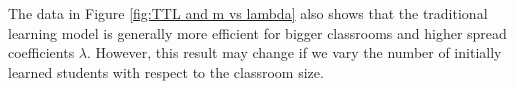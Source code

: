 \documentclass[10pt,a4paper,twoside]{article}
\begin{document}
\noindent The data in Figure \ref{fig:TTL and m vs lambda} also shows that the traditional learning model is generally more efficient for bigger classrooms and higher spread coefficients $\lambda$. However, this result may change if we vary the number of initially learned students with respect to the classroom size.

\begin{figure}[h]
  \centering
  \quad %
  \quad %
  \quad %
  \quad %

\end{figure}
\end{document}
